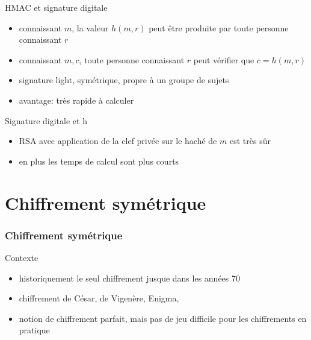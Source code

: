 \begin{reveals}
\begin{frame}
  \begin{block}{HMAC et signature digitale}
    \begin{itemize}
    \item connaissant \(m\), la valeur \(h(m,r)\) peut être produite
      par toute personne connaissant \(r\)
    \item connaissant \(m,c\), toute personne connaissant \(r\) peut
      vérifier que \(c=h(m,r)\)
    \item signature light, symétrique, propre à un groupe de sujets
    \item avantage: très rapide à calculer
    \end{itemize}
  \end{block}

  \vfill

  \begin{block}{Signature digitale et h}
    \begin{itemize}
    \item RSA avec application de la clef privée sur le haché de \(m\)
      est très sûr
    \item en plus les temps de calcul sont plus courts
    \end{itemize}
  \end{block}

  \vfill



\end{frame}



\section{Chiffrement symétrique}




\begin{frame}
  \frametitle{Chiffrement symétrique}

  \vfill
  
  \begin{block}{Contexte}
    \begin{itemize}
    \item historiquement le seul chiffrement jusque dans les années 70
    \item chiffrement de César, de Vigenère, Enigma,
    \item notion de chiffrement parfait, mais pas de jeu difficile
      pour les chiffrements en pratique
    \end{itemize}
  \end{block}
  

\end{frame}
\end{reveals}
